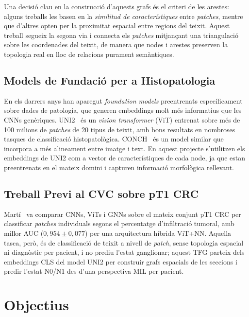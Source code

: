 \documentclass[10pt,a4paper,twocolumn,twoside]{article}
\begin{document}
Una decisió clau en la construcció d'aquests grafs és el criteri de les arestes: alguns
treballs les basen en la \textit{similitud de característiques} entre \textit{patches},
mentre que d'altres opten per la proximitat espacial entre regions del teixit.
Aquest treball segueix la segona via i connecta els \textit{patches} mitjançant una
triangulació sobre les coordenades del teixit, de manera que nodes i arestes
preserven la topologia real en lloc de relacions purament semàntiques.

\subsection{Models de Fundació per a Histopatologia}

En els darrers anys han aparegut \textit{foundation models} preentrenats específicament
sobre dades de patologia, que generen embeddings molt més informatius que les CNNs
genèriques. UNI2~\cite{chen2024uni2} és un \textit{vision transformer} (ViT) entrenat sobre
més de 100 milions de \textit{patches} de 20 tipus de teixit, amb bons resultats en
nombroses tasques de classificació histopatològica. CONCH~\cite{lu2024conch} és un model
similar que incorpora a més alineament entre imatge i text. En aquest projecte s'utilitzen
els embeddings de UNI2 com a vector de característiques de cada node, ja que estan
preentrenats en el mateix domini i capturen informació morfològica rellevant.

\subsection{Treball Previ al CVC sobre pT1 CRC}

Martí~\cite{ddd.uab.cat:317556} va comparar CNNs, ViTs i GNNs sobre el mateix conjunt
pT1 CRC per classificar \textit{patches} individuals segons el percentatge d'infiltració
tumoral, amb millor AUC ($0{,}954 \pm 0{,}077$) per una arquitectura híbrida ViT+NN.
Aquella tasca, però, és de classificació de teixit a nivell de \textit{patch}, sense
topologia espacial ni diagnòstic per pacient, i no prediu l'estat ganglionar; aquest TFG
parteix dels embeddings CLS del model UNI2 per construir grafs espacials de les seccions
i predir l'estat N0/N1 des d'una perspectiva MIL per pacient.

\section{Objectius}
\end{document}
